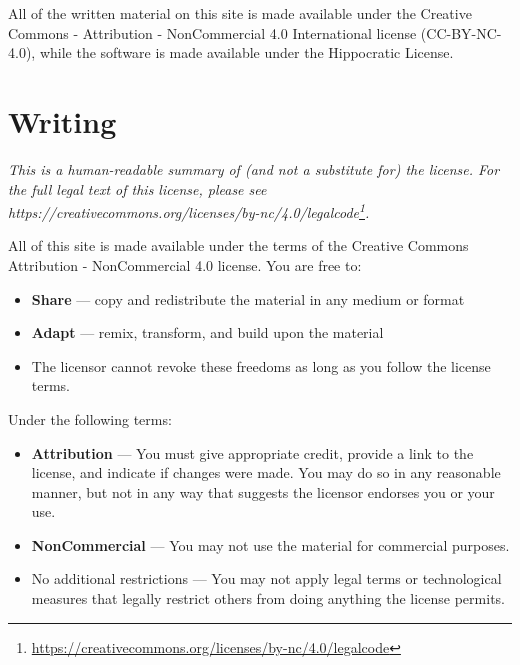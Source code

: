 \documentclass[krantzl]{krantz}
\newcommand{\hreffoot}[2]{{#1}\footnote{\href{#2}{#2}}}
\begin{document}
All of the written material on this site is made available under the Creative
Commons - Attribution - NonCommercial 4.0 International license (CC-BY-NC-4.0),
while the software is made available under the Hippocratic License.

\section*{Writing}


\emph{This is a human-readable summary of (and not a substitute for) the license.
For the full legal text of this license, please see
\hreffoot{https://creativecommons.org/licenses/by-nc/4.0/legalcode}{https://creativecommons.org/licenses/by-nc/4.0/legalcode}.}


All of this site is made available under the terms of the Creative Commons
Attribution - NonCommercial 4.0 license. You are free to:

\begin{itemize}

\item 

\textbf{Share} — copy and redistribute the material in any medium or format



\item 

\textbf{Adapt} — remix, transform, and build upon the material



\item 

The licensor cannot revoke these freedoms as long as you follow the license
    terms.



\end{itemize}


Under the following terms:

\begin{itemize}

\item 

\textbf{Attribution} — You must give appropriate credit, provide a link to the
    license, and indicate if changes were made. You may do so in any reasonable
    manner, but not in any way that suggests the licensor endorses you or your
    use.



\item 

\textbf{NonCommercial} — You may not use the material for commercial purposes.



\item 

No additional restrictions — You may not apply legal terms or technological
    measures that legally restrict others from doing anything the license
    permits.



\end{itemize}
\end{document}
